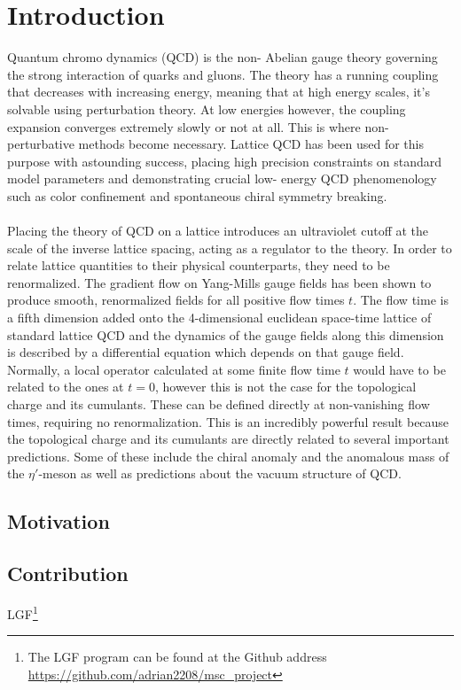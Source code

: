 \documentclass[a4paper,10pt]{book}
\begin{document}
\chapter{Introduction}
Quantum chromo dynamics (QCD) is the non- Abelian gauge theory governing the strong interaction of quarks and gluons. The theory has a running coupling that decreases with increasing energy, meaning that at high energy scales,
it’s solvable using perturbation theory. At low energies however, the coupling
expansion converges extremely slowly or not at all. This is where non- perturbative methods become necessary. Lattice QCD has been used for this purpose
with astounding success, placing high precision constraints on standard model
parameters and demonstrating crucial low- energy QCD phenomenology such as
color confinement and spontaneous chiral symmetry breaking.\\\\Placing the theory of QCD on a lattice introduces an ultraviolet cutoff at the scale of the inverse lattice spacing, acting as a regulator to the theory. In order to relate lattice quantities to their physical counterparts, they need to be renormalized. The gradient flow on Yang-Mills gauge fields has been shown \cite{Luscher2010} to produce smooth, renormalized fields for all positive flow times $t$. The flow time is a fifth dimension added onto the 4-dimensional euclidean space-time lattice of standard lattice QCD and the dynamics of the gauge fields along this dimension is described by a differential equation which depends on that gauge field. Normally, a local operator calculated at some finite flow time $t$ would have to be related to the ones at $t=0$, however this is not the case for the topological charge and its cumulants. These can be defined directly at non-vanishing flow times, requiring no renormalization. This is an incredibly powerful result because the topological charge and its cumulants are directly related to several important predictions. Some of these include the chiral anomaly and the anomalous mass of the $\eta\prime$-meson as well as predictions about the vacuum structure of QCD.
\section{Motivation}
\section{Contribution}
LGF\footnote{The LGF program can be found at the Github address \url{https://github.com/adrian2208/msc_project}}
\end{document}
